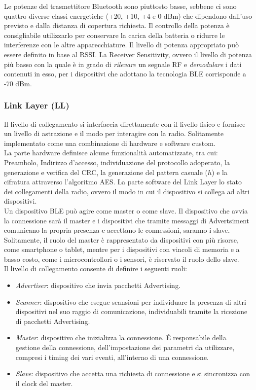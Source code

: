 \noindent Le potenze del trasmettitore Bluetooth sono piuttosto basse, sebbene ci sono quattro diverse classi energetiche (+20, +10, +4 e 0 dBm) che dipendono dall'uso previsto e dalla distanza di copertura richiesta. Il controllo della potenza è consigliabile utilizzarlo per conservare la carica della batteria o ridurre le interferenze con le altre apparecchiature. Il livello di potenza appropriato può essere definito in base al RSSI. La Receiver Sensitivity, ovvero il livello di potenza più basso con la quale è in grado di \textit{rilevare} un segnale RF e \textit{demodulare} i dati contenuti in esso, per i dispositivi che adottano la tecnologia BLE corrisponde a -70 dBm.

\subsubsection{Link Layer (LL)}
Il livello di collegamento si interfaccia direttamente con il livello fisico e fornisce un livello di astrazione e il modo per interagire con la radio. Solitamente implementato come una combinazione di hardware e software custom.\\
La parte hardware definisce alcune funzionalità automatizzate, tra cui: Preambolo, Indirizzo d'accesso, individuazione del protocollo adoperato, la generazione e verifica del CRC, la generazione del pattern casuale ($h$) e la cifratura attraverso l'algoritmo AES.
La parte software del Link Layer lo stato dei collegamenti della radio, ovvero il modo in cui il dispositivo si collega ad altri dispositivi. \\
Un dispositivo BLE può agire come master o come slave. Il dispositivo che avvia la connessione sarà il master e i dispositivi che tramite messaggi di Advertsiment comunicano la propria presenza e accettano le connessioni, saranno i slave. 
Solitamente, il ruolo del master è rappresentato da dispositivi con più risorse, come smartphone o tablet, mentre per i dispositivi con vincoli di memoria e a basso costo, come i microcontrollori o i sensori, è riservato il ruolo dello slave.\\

\noindent Il livello di collegamento consente di definire i seguenti ruoli:
\begin{itemize}
    \item \textit{Advertiser}: dispositivo che invia pacchetti Advertising.
    \item \textit{Scanner}: dispositivo che esegue scansioni per individuare la presenza di altri dispositivi nel suo raggio di comunicazione, individuabili tramite la ricezione di pacchetti Advertising.
    \item \textit{Master}: dispositivo che inizializza la connessione. \MakeUppercase{é} responsabile della gestione della connessione, dell'impostazione dei parametri da utilizzare, compresi i timing dei vari eventi, all'interno di una connessione.
    
    \item \textit{Slave}: dispositivo che accetta una richiesta di connessione e si sincronizza con il clock del master.
\end{itemize}

